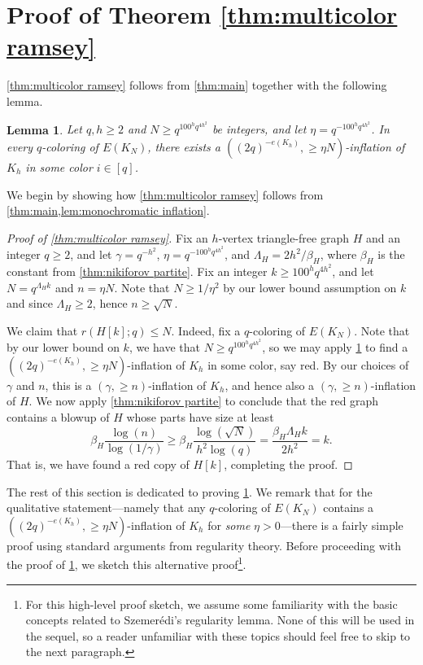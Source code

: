 \documentclass{aic}
\theoremstyle{plain}
\newtheorem{lemma}[theorem]{Lemma}
\theoremstyle{remark}
\begin{document}
\section{Proof of Theorem \ref{thm:multicolor ramsey}}\label{sec:ramsey}

\cref{thm:multicolor ramsey} follows from \cref{thm:main} together with the following lemma.
\begin{lemma}\label{lem:monochromatic inflation}
    Let $q,h \geq 2$ and $N\geq q^{100^h q^{4h^2}}$ be integers, and let $\eta=q^{-100^h q^{4h^2}}$. In every $q$-coloring of $E(K_N)$, there exists a $((2q)^{-e(K_h)}, \geq \eta N)$-inflation of $K_h$ in some color $i \in [q]$.
\end{lemma}

We begin by showing how \cref{thm:multicolor ramsey} follows from \cref{thm:main,lem:monochromatic inflation}.
\begin{proof}[Proof of \cref{thm:multicolor ramsey}]
Fix an $h$-vertex triangle-free graph $H$ and an integer $q \geq 2$, and let $\gamma = q^{-h^2}$, $\eta = q^{-100^h q^{4h^2}}$, and $\Lambda_H=2h^2/\beta_H$, where $\beta_H$ is the constant from \cref{thm:nikiforov partite}. 
Fix an integer $k \geq 100^h q^{4h^2}$, and let $N = q^{\Lambda_H k}$ and $n = \eta N$. Note that $N \geq 1/\eta^2$ by our lower bound assumption on $k$ and since $\Lambda_H \geq 2$, hence $n \geq \sqrt N$.

We claim that $r(H[k];q) \leq N$. Indeed,
fix a $q$-coloring of $E(K_N)$. Note that by our lower bound on $k$, we have that $N \geq q^{100^h q^{4h^2}}$, so we may apply \cref{lem:monochromatic inflation} to find a $((2q)^{-e(K_h)}, \geq \eta N)$-inflation of $K_h$ in some color, say red. By our choices of $\gamma$ and $n$, this is a $(\gamma, \geq n)$-inflation of $K_h$, and hence also a $(\gamma, \geq n)$-inflation of $H$. We now apply \cref{thm:nikiforov partite} to conclude that the red graph contains a blowup of $H$ whose parts have size at least
\[
\beta_H \frac{\log(n)}{\log(1/\gamma)} \geq \beta_H\frac{\log(\sqrt N)}{h^2 \log(q)} =\frac{\beta_H \Lambda_H k}{2h^2} = k.
\]
That is, we have found a red copy of $H[k]$, completing the proof.
\end{proof}


The rest of this section is dedicated to proving \cref{lem:monochromatic inflation}. We remark that for the qualitative statement---namely that any $q$-coloring of $E(K_N)$ contains a $((2q)^{-e(K_h)}, \geq\eta N)$-inflation of $K_h$ for \emph{some} $\eta>0$---there is a fairly simple proof using standard arguments from regularity theory. Before proceeding with the proof of \cref{lem:monochromatic inflation}, we sketch this alternative proof\footnote{For this high-level proof sketch, we assume some familiarity with the basic concepts related to Szemer\'edi's regularity lemma. None of this will be used in the sequel, so a reader unfamiliar with these topics should feel free to skip to the next paragraph.}.
\end{document}
